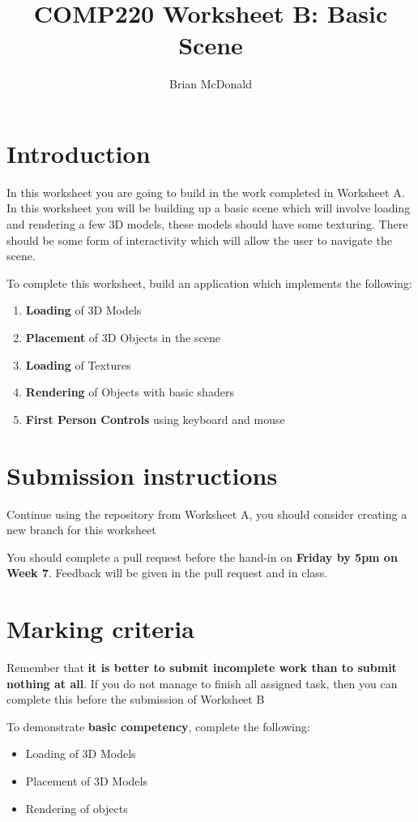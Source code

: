\documentclass{../../../fal_assignment}
\title{COMP220 Worksheet B: Basic Scene}
\author{Brian McDonald}
\begin{document}
\maketitle

\section*{Introduction}

In this worksheet you are going to build in the work completed in Worksheet A. In this worksheet you will be building up a basic scene which will involve loading and rendering a few 3D models, these models should have some texturing. There should be some form of interactivity which will allow the user to navigate the scene.

To complete this worksheet, build an application which implements the following:
\begin{enumerate}[label=(\alph*)]
	\item \textbf{Loading} of 3D Models
	\item \textbf{Placement} of 3D Objects in the scene
	\item \textbf{Loading} of Textures
	\item \textbf{Rendering} of Objects with basic shaders
	\item \textbf{First Person Controls} using keyboard and mouse
\end{enumerate}

\section*{Submission instructions}

Continue using the repository from Worksheet A, you should consider creating a new branch for this worksheet

You should complete a pull request before the hand-in on \textbf{Friday by 5pm on Week 7}. Feedback will be given in the pull request and in class.

\section*{Marking criteria}

Remember that \textbf{it is better to submit incomplete work than to submit nothing at all}. If you do not manage to finish all assigned task, then you can complete this before the submission of Worksheet B

To demonstrate \textbf{basic competency}, complete the following:
\begin{itemize}
	\item Loading of 3D Models
	\item Placement of 3D Models
	\item Rendering of objects
\end{itemize} 
\end{document}
